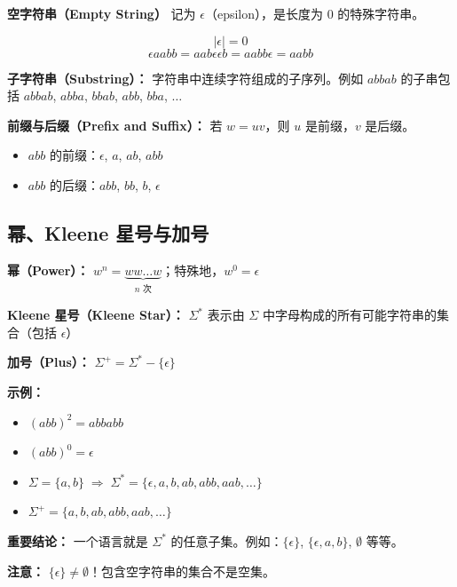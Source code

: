 \documentclass[12pt,a4paper]{ctexart}
\newcommand{\term}[1]{\textbf{\textcolor{mainblue}{#1}}}
\begin{document}
\begin{keybox}
  \term{空字符串（Empty String）} 记为 $\epsilon$（epsilon），是长度为 0 的特殊字符串。
\end{keybox}

$$|\epsilon| = 0$$
$$\epsilon aabb = aab\epsilon\epsilon b = aabb\epsilon = aabb$$

\textbf{子字符串（Substring）：} 字符串中连续字符组成的子序列。例如 $abbab$ 的子串包括 $abbab$, $abba$, $bbab$, $abb$, $bba$, $\dots$

\textbf{前缀与后缀（Prefix and Suffix）：} 若 $w = uv$，则 $u$ 是前缀，$v$ 是后缀。
\begin{itemize}
  \item $abb$ 的前缀：$\epsilon$, $a$, $ab$, $abb$
  \item $abb$ 的后缀：$abb$, $bb$, $b$, $\epsilon$
\end{itemize}

\subsection{幂、Kleene 星号与加号}

\begin{keybox}
  \term{幂（Power）：} $w^n = \underbrace{ww\dots w}_{n\text{ 次}}$；特殊地，$w^0 = \epsilon$

  \term{Kleene 星号（Kleene Star）：} $\Sigma^*$ 表示由 $\Sigma$ 中字母构成的所有可能字符串的集合（包括 $\epsilon$）

  \term{加号（Plus）：} $\Sigma^+ = \Sigma^* - \{\epsilon\}$
\end{keybox}

\textbf{示例：}
\begin{itemize}[itemsep=0.2em]
  \item $(abb)^2 = abbabb$
  \item $(abb)^0 = \epsilon$
  \item $\Sigma = \{a, b\} \;\Longrightarrow\; \Sigma^* = \{\epsilon, a, b, ab, abb, aab, \dots\}$
  \item $\Sigma^+ = \{a, b, ab, abb, aab, \dots\}$
\end{itemize}

\begin{notebox}
  \textbf{重要结论：} 一个语言就是 $\Sigma^*$ 的任意子集。例如：$\{\epsilon\}$, $\{\epsilon, a, b\}$, $\emptyset$ 等等。

  \textbf{注意：} $\{\epsilon\} \neq \emptyset$！包含空字符串的集合不是空集。
\end{notebox}
\end{document}
